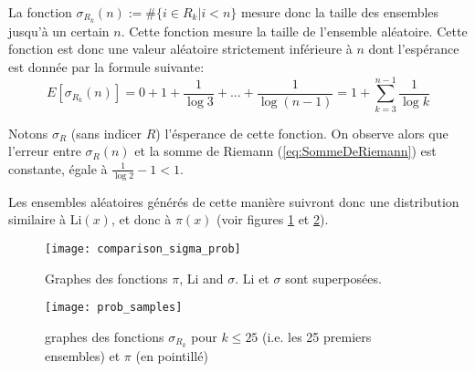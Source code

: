 \documentclass[../main.tex]{report}
\begin{document}
La fonction $\sigma_{R_k}(n) := \# \{i \in R_{k} | i < n\}$ mesure donc la taille des ensembles jusqu'à un certain $n$. Cette fonction mesure la taille de l'ensemble aléatoire. 
Cette fonction est donc une valeur aléatoire strictement inférieure à $n$ dont l'espérance est donnée par la formule suivante:
\begin{equation}
\label{eq:esperance}
E[\sigma_{R_k}(n)] = 0 + 1 + \frac{1}{\log 3} + ... + \frac{1}{\log (n-1)}
= 1 + \sum_{k=3}^{n-1} \frac{1}{\log k}
\end{equation}

Notons $\sigma_R$ (sans indicer $R$) l'ésperance de cette fonction.
On observe alors que l'erreur entre $\sigma_R(n)$ et la somme de Riemann (\ref{eq:SommeDeRiemann}) est constante, égale à
$\frac{1}{\log 2}- 1 < 1$.

Les ensembles aléatoires générés de cette manière suivront donc une distribution similaire à Li$(x)$, et donc à $\pi(x)$
(voir figures \ref{fig:comparison_sigma_prob} et \ref{fig:prob_sample}).

\begin{figure}[H]
\texttt{[image: comparison\_sigma\_prob]}

\caption{Graphes des fonctions $\pi$, Li and $\sigma$. Li et $\sigma$ sont superposées.}
\label{fig:comparison_sigma_prob}
\end{figure}

\begin{figure}[H]
	\centering
	\texttt{[image: prob\_samples]}
	\caption{graphes des fonctions $\sigma_{R_k}$ pour $k \leq 25$ (i.e. les 25 premiers ensembles) et $\pi$ (en pointillé)}
	\label{fig:prob_sample}
\end{figure}
\end{document}
